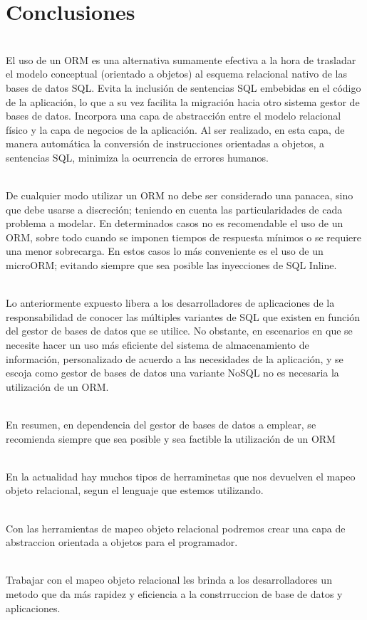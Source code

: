 \section{Conclusiones} 
\begin{flushleft}
\begin{itemize}
\textbf{}\\
El uso de un ORM es una alternativa sumamente efectiva a la hora de trasladar el modelo conceptual
(orientado a objetos) al esquema relacional nativo de las bases de datos SQL. Evita la inclusión de
sentencias SQL embebidas en el código de la aplicación, lo que a su vez facilita la migración hacia otro
sistema gestor de bases de datos. Incorpora una capa de abstracción entre el modelo relacional físico y
la capa de negocios de la aplicación. Al ser realizado, en esta capa, de manera automática la conversión
de instrucciones orientadas a objetos, a sentencias SQL, minimiza la ocurrencia de errores humanos.

\textbf{}\\
De cualquier modo utilizar un ORM no debe ser considerado una panacea, sino que debe usarse a
discreción; teniendo en cuenta las particularidades de cada problema a modelar. En determinados casos
no es recomendable el uso de un ORM, sobre todo cuando se imponen tiempos de respuesta mínimos o
se requiere una menor sobrecarga. En estos casos lo más conveniente es el uso de un microORM;
evitando siempre que sea posible las inyecciones de SQL Inline.

\textbf{}\\
Lo anteriormente expuesto libera a los desarrolladores de aplicaciones de la responsabilidad de conocer
las múltiples variantes de SQL que existen en función del gestor de bases de datos que se utilice. No
obstante, en escenarios en que se necesite hacer un uso más eficiente del sistema de almacenamiento
de información, personalizado de acuerdo a las necesidades de la aplicación, y se escoja como gestor de
bases de datos una variante NoSQL no es necesaria la utilización de un ORM. 

\textbf{}\\
En resumen, en dependencia del gestor de bases de datos a emplear, se recomienda siempre que sea
posible y sea factible la utilización de un ORM

\textbf{}\\
En la actualidad hay muchos tipos de herraminetas que nos devuelven el mapeo objeto relacional, segun el lenguaje que estemos utilizando.

\textbf{}\\
Con las herramientas de mapeo objeto relacional podremos crear una capa  de abstraccion orientada a objetos para el programador.

\textbf{}\\
Trabajar con el mapeo objeto relacional les brinda a los desarrolladores un metodo que da más rapidez y eficiencia a la constrruccion de base de datos y aplicaciones.

\end{itemize} 


\end{flushleft}

